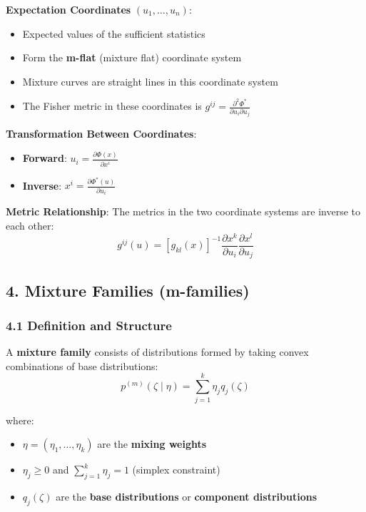 \documentclass{amsart}
\theoremstyle{plain}
\theoremstyle{definition}
\theoremstyle{remark}
\begin{document}
\textbf{Expectation Coordinates} $(u_1, \ldots, u_n)$:

\begin{itemize}
	\item Expected values of the sufficient statistics
	\item Form the \textbf{m-flat} (mixture flat) coordinate system
	\item Mixture curves are straight lines in this coordinate system
	\item The Fisher metric in these coordinates is $g^{ij} = \frac{\partial^2 \Phi^*}{\partial u_i \partial u_j}$
\end{itemize}

\textbf{Transformation Between Coordinates}:

\begin{itemize}
	\item \textbf{Forward}: $u_i = \frac{\partial \Phi(x)}{\partial x^i}$
	\item \textbf{Inverse}: $x^i = \frac{\partial \Phi^*(u)}{\partial u_i}$
\end{itemize}

\textbf{Metric Relationship}:
The metrics in the two coordinate systems are inverse to each other:
\[
g^{ij}(u) = \left[g_{kl}(x)\right]^{-1} \frac{\partial x^k}{\partial u_i} \frac{\partial x^l}{\partial u_j}
\]

\subsection{4. Mixture Families (m-families)}

\subsubsection{4.1 Definition and Structure}

A \textbf{mixture family} consists of distributions formed by taking convex combinations of base distributions:
\[
p^{(m)}(\zeta \mid \eta) = \sum_{j=1}^k \eta_j q_j(\zeta)
\]

where:

\begin{itemize}
	\item $\eta = (\eta_1, \ldots, \eta_k)$ are the \textbf{mixing weights}
	\item $\eta_j \geq 0$ and $\sum_{j=1}^k \eta_j = 1$ (simplex constraint)
	\item $q_j(\zeta)$ are the \textbf{base distributions} or \textbf{component distributions}
\end{itemize}
\end{document}
